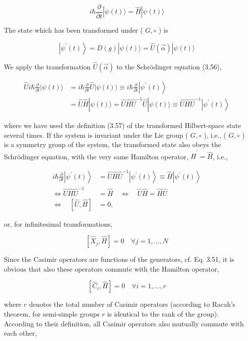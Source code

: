 \documentclass[10pt, letterpaper]{article}
\begin{document}
$$
i \hbar \frac{\partial}{\partial t}|\psi(t)\rangle=\hat{H}|\psi(t)\rangle
$$

The state which has been transformed under ( $G, \circ$ ) is

$$
\left|\psi^{\prime}(t)\right\rangle=D(g)|\psi(t)\rangle=\hat{U}(\vec{\alpha})|\psi(t)\rangle
$$

We apply the transformation $\hat{U}(\vec{\alpha})$ to the Schrödinger equation (3.56),

$$
\begin{aligned}
\hat{U} i \hbar \frac{\partial}{\partial t}|\psi(t)\rangle & =i \hbar \frac{\partial}{\partial t} \hat{U}|\psi(t)\rangle \equiv i \hbar \frac{\partial}{\partial t}\left|\psi^{\prime}(t)\right\rangle \\
& =\hat{U} \hat{H}|\psi(t)\rangle=\hat{U} \hat{H} \hat{U}^{-1} \hat{U}|\psi(t)\rangle \equiv \hat{U} \hat{H} \hat{U}^{-1}\left|\psi^{\prime}(t)\right\rangle
\end{aligned}
$$

where we have used the definition (3.57) of the transformed Hilbert-space state several times. If the system is invariant under the Lie group ( $G, \circ$ ), i.e., ( $G, \circ$ ) is a symmetry group of the system, the transformed state also obeys the Schrödinger equation, with the very same Hamilton operator, $\hat{H}^{\prime}=\hat{H}$, i.e.,

$$
\begin{aligned}
i \hbar \frac{\partial}{\partial t}\left|\psi^{\prime}(t)\right\rangle & =\hat{U} \hat{H} \hat{U}^{-1}\left|\psi^{\prime}(t)\right\rangle \equiv \hat{H}\left|\psi^{\prime}(t)\right\rangle \\
\Longleftrightarrow \hat{U} \hat{H} \hat{U}^{-1} & =\hat{H} \quad \Longleftrightarrow \quad \hat{U} \hat{H}=\hat{H} \hat{U} \\
\Longleftrightarrow \quad[\hat{U}, \hat{H}] & =0,
\end{aligned}
$$

or, for infinitesimal transformations,

$$
\left[\hat{X}_{j}, \hat{H}\right]=0 \quad \forall j=1, \ldots, N
$$

Since the Casimir operators are functions of the generators, cf. Eq. 3.51, it is obvious that also these operators commute with the Hamilton operator,

$$
\left[\hat{C}_{i}, \hat{H}\right]=0 \quad \forall i=1, \ldots, r
$$

where $r$ denotes the total number of Casimir operators (according to Racah's theorem, for semi-simple groups $r$ is identical to the rank of the group). According to their definition, all Casimir operators also mutually commute with each other,
\end{document}
